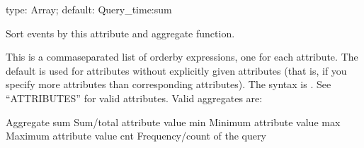 \documentclass[letterpaper,10pt,english]{sphinxmanual}
\begin{document}
\begin{fulllineitems}
\label{\detokenize{mariadb-query-digest:cmdoption-mariadb-query-digest-order-by}}
type: Array; default: Query\_time:sum

Sort events by this attribute and aggregate function.

This is a comma\sphinxhyphen{}separated list of order\sphinxhyphen{}by expressions, one for each
{\hyperref[\detokenize{mariadb-query-digest:cmdoption-mariadb-query-digest-group-by}]{}} attribute.  The default  is used for
{\hyperref[\detokenize{mariadb-query-digest:cmdoption-mariadb-query-digest-group-by}]{}} attributes without explicitly given {\hyperref[\detokenize{mariadb-query-digest:cmdoption-mariadb-query-digest-order-by}]{}} attributes
(that is, if you specify more {\hyperref[\detokenize{mariadb-query-digest:cmdoption-mariadb-query-digest-group-by}]{}} attributes than corresponding
{\hyperref[\detokenize{mariadb-query-digest:cmdoption-mariadb-query-digest-order-by}]{}} attributes).  The syntax is .  See
“ATTRIBUTES” for valid attributes.  Valid aggregates are:

\begin{sphinxVerbatim}[commandchars=\\\{\}]
Aggregate 
 
sum       Sum/total attribute value
min       Minimum attribute value
max       Maximum attribute value
cnt       Frequency/count of the query
\end{sphinxVerbatim}


\end{fulllineitems}
\end{document}
